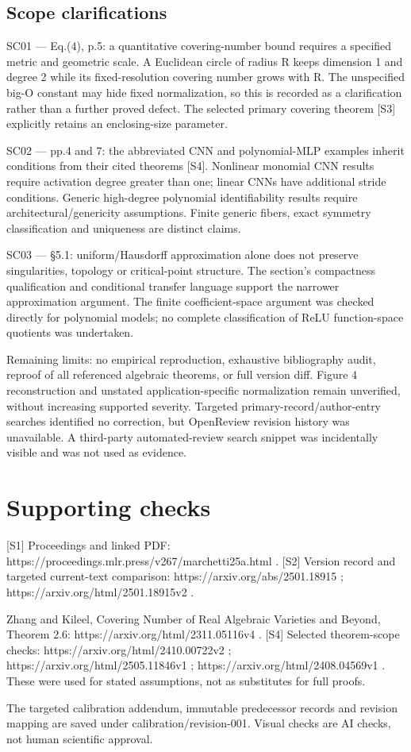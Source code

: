 \documentclass[10pt]{article}
\begin{document}
\subsection*{Scope clarifications}
SC01 — Eq.(4), p.5: a quantitative covering-number bound requires a specified metric and geometric scale. A Euclidean circle of radius R keeps dimension 1 and degree 2 while its fixed-resolution covering number grows with R. The unspecified big-O constant may hide fixed normalization, so this is recorded as a clarification rather than a further proved defect. The selected primary covering theorem [S3] explicitly retains an enclosing-size parameter.\par
SC02 — pp.4 and 7: the abbreviated CNN and polynomial-MLP examples inherit conditions from their cited theorems [S4]. Nonlinear monomial CNN results require activation degree greater than one; linear CNNs have additional stride conditions. Generic high-degree polynomial identifiability results require architectural/genericity assumptions. Finite generic fibers, exact symmetry classification and uniqueness are distinct claims.\par
SC03 — §5.1: uniform/Hausdorff approximation alone does not preserve singularities, topology or critical-point structure. The section’s compactness qualification and conditional transfer language support the narrower approximation argument. The finite coefficient-space argument was checked directly for polynomial models; no complete classification of ReLU function-space quotients was undertaken.\par
Remaining limits: no empirical reproduction, exhaustive bibliography audit, reproof of all referenced algebraic theorems, or full version diff. Figure 4 reconstruction and unstated application-specific normalization remain unverified, without increasing supported severity. Targeted primary-record/author-entry searches identified no correction, but OpenReview revision history was unavailable. A third-party automated-review search snippet was incidentally visible and was not used as evidence.\par
\section*{Supporting checks}
[S1] Proceedings and linked PDF: https://proceedings.mlr.press/v267/marchetti25a.html . [S2] Version record and targeted current-text comparison: https://arxiv.org/abs/2501.18915 ; https://arxiv.org/html/2501.18915v2 .\par
Zhang and Kileel, Covering Number of Real Algebraic Varieties and Beyond, Theorem 2.6: https://arxiv.org/html/2311.05116v4 . [S4] Selected theorem-scope checks: https://arxiv.org/html/2410.00722v2 ; https://arxiv.org/html/2505.11846v1 ; https://arxiv.org/html/2408.04569v1 . These were used for stated assumptions, not as substitutes for full proofs.\par
The targeted calibration addendum, immutable predecessor records and revision mapping are saved under calibration/revision-001. Visual checks are AI checks, not human scientific approval.\par
\end{document}
